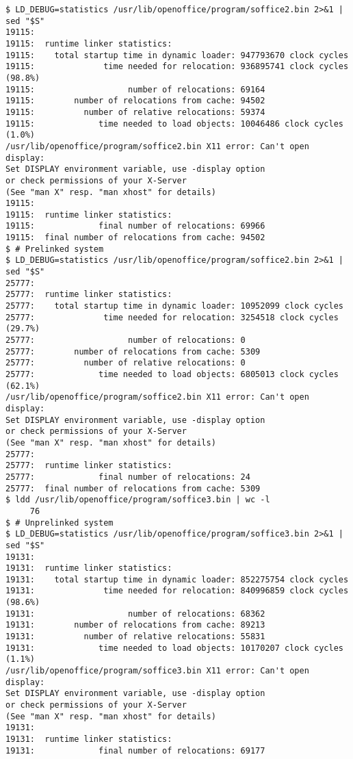 \documentclass[twoside]{article}
\begin{document}
{{\begin{verbatim}
$ LD_DEBUG=statistics /usr/lib/openoffice/program/soffice2.bin 2>&1 | sed "$S"
19115:
19115:  runtime linker statistics:
19115:    total startup time in dynamic loader: 947793670 clock cycles
19115:              time needed for relocation: 936895741 clock cycles (98.8%)
19115:                   number of relocations: 69164
19115:        number of relocations from cache: 94502
19115:          number of relative relocations: 59374
19115:             time needed to load objects: 10046486 clock cycles (1.0%)
/usr/lib/openoffice/program/soffice2.bin X11 error: Can't open display:
Set DISPLAY environment variable, use -display option
or check permissions of your X-Server
(See "man X" resp. "man xhost" for details)
19115:
19115:  runtime linker statistics:
19115:             final number of relocations: 69966
19115:  final number of relocations from cache: 94502
$ # Prelinked system
$ LD_DEBUG=statistics /usr/lib/openoffice/program/soffice2.bin 2>&1 | sed "$S"
25777:
25777:  runtime linker statistics:
25777:    total startup time in dynamic loader: 10952099 clock cycles
25777:              time needed for relocation: 3254518 clock cycles (29.7%)
25777:                   number of relocations: 0
25777:        number of relocations from cache: 5309
25777:          number of relative relocations: 0
25777:             time needed to load objects: 6805013 clock cycles (62.1%)
/usr/lib/openoffice/program/soffice2.bin X11 error: Can't open display:
Set DISPLAY environment variable, use -display option
or check permissions of your X-Server
(See "man X" resp. "man xhost" for details)
25777:
25777:  runtime linker statistics:
25777:             final number of relocations: 24
25777:  final number of relocations from cache: 5309
$ ldd /usr/lib/openoffice/program/soffice3.bin | wc -l
     76
$ # Unprelinked system
$ LD_DEBUG=statistics /usr/lib/openoffice/program/soffice3.bin 2>&1 | sed "$S"
19131:
19131:  runtime linker statistics:
19131:    total startup time in dynamic loader: 852275754 clock cycles
19131:              time needed for relocation: 840996859 clock cycles (98.6%)
19131:                   number of relocations: 68362
19131:        number of relocations from cache: 89213
19131:          number of relative relocations: 55831
19131:             time needed to load objects: 10170207 clock cycles (1.1%)
/usr/lib/openoffice/program/soffice3.bin X11 error: Can't open display:
Set DISPLAY environment variable, use -display option
or check permissions of your X-Server
(See "man X" resp. "man xhost" for details)
19131:
19131:  runtime linker statistics:
19131:             final number of relocations: 69177

\end{verbatim}}}
\end{document}
